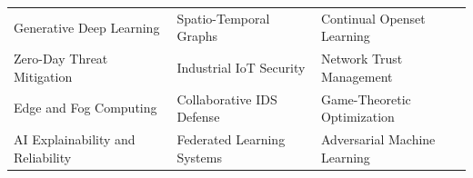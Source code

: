 

\begin{tabularx}{\textwidth}{@{}X X X@{}}
\noindent{\color{MarkerColour}\faAngleRight} {Generative Deep Learning}
&
\noindent{\color{MarkerColour}\faAngleRight} {Spatio-Temporal Graphs}
&
\noindent{\color{MarkerColour}\faAngleRight} {Continual Openset Learning}
\\
\noindent{\color{MarkerColour}\faAngleRight} {Zero-Day Threat Mitigation}
&
\noindent{\color{MarkerColour}\faAngleRight} {Industrial IoT Security}
&
\noindent{\color{MarkerColour}\faAngleRight} {Network Trust Management}
\\
\noindent{\color{MarkerColour}\faAngleRight} {Edge and Fog Computing}
&
\noindent{\color{MarkerColour}\faAngleRight} {Collaborative IDS Defense}
&
\noindent{\color{MarkerColour}\faAngleRight} {Game-Theoretic Optimization}
\\
\noindent{\color{MarkerColour}\faAngleRight} {AI Explainability and Reliability}
&
\noindent{\color{MarkerColour}\faAngleRight} {Federated Learning Systems}
&
\noindent{\color{MarkerColour}\faAngleRight} {Adversarial Machine Learning}
\\
\end{tabularx}